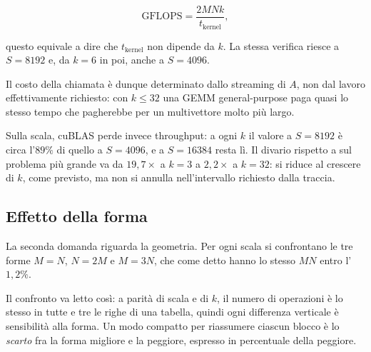 \[
\text{GFLOPS} = \frac{2MNk}{t_{\text{kernel}}},
\]

questo equivale a dire che $t_{\text{kernel}}$ non dipende da $k$. La stessa
verifica riesce a $S=8192$ e, da $k=6$ in poi, anche a $S=4096$.

Il costo della chiamata è dunque determinato dallo streaming di $A$, non dal
lavoro effettivamente richiesto: con $k\le32$ una GEMM general-purpose paga
quasi lo stesso tempo che pagherebbe per un multivettore molto più largo.

Sulla scala, cuBLAS perde invece throughput: a ogni $k$ il valore a $S=8192$
è circa l'$89\%$ di quello a $S=4096$, e a $S=\num{16384}$ resta lì. Il
divario rispetto a  sul problema più grande va da
$19{,}7\times$ a $k=3$ a $2{,}2\times$ a $k=32$: si riduce al crescere di $k$,
come previsto, ma non si annulla nell'intervallo richiesto dalla traccia.


\subsection{Effetto della forma}
\label{sec:ris-fase2-forma}

La seconda domanda riguarda la geometria. Per ogni scala si confrontano le tre
forme $M=N$, $N=2M$ e $M=3N$, che come detto hanno lo stesso $MN$ entro
l'$1{,}2\%$.

Il confronto va letto così: a parità di scala e di $k$, il numero di
operazioni è lo stesso in tutte e tre le righe di una tabella, quindi ogni
differenza verticale è sensibilità alla forma. Un modo compatto per
riassumere ciascun blocco è lo \emph{scarto} fra la forma migliore e la
peggiore, espresso in percentuale della peggiore.

\subsubsection{}

